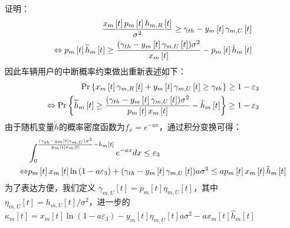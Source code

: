 证明：
\begin{align} \label{E4-15}
\frac{x_m\left[t\right]p_m\left[t\right]h_{m,R}\left[t\right]}{\sigma^2}\geq \gamma_{th}-y_m\left[t\right]\gamma_{m,U}\left[t\right] \\
\Leftrightarrow
p_m\left[t\right]{\widetilde{h}}_{m}\left[t\right]\geq \frac{{(\gamma_{th}-y_m\left[t\right]\gamma_{m,U}\left[t\right])\sigma^2}}{x_m\left[t\right]}
-p_m\left[t\right]{\hat{h}}_{m}\left[t\right]   \notag
\end{align}
因此车辆用户的中断概率约束做出重新表述如下：
\begin{align} \label{E4-16}
\Pr\left\{x_m\left[t\right]\gamma_{m,R}\left[t\right]+y_m\left[t\right]\gamma_{m,U}\left[t\right] \geq \gamma_{th}\right\}\geq1-\varepsilon_3    \\
\Leftrightarrow
\Pr\left\{{\widetilde{h}}_{m}\left[t\right]\geq \frac{{(\gamma_{th}-y_m\left[t\right]\gamma_{m,U}\left[t\right])\sigma^2}}{p_m\left[t\right]x_m\left[t\right]}
-{\hat{h}}_{m}\left[t\right]\right\}\geq1-\varepsilon_3                          \notag
\end{align}
由于随机变量$\widetilde{h}$的概率密度函数为$f_x={{e}^{-ax}}$，通过积分变换可得：
\begin{align} \label{E4-17}
&\int_{0}^{\frac{{(\gamma_{th}-y_m\left[t\right]\gamma_{m,U})\sigma^2}}{p_m\left[t\right]x_m\left[t\right]}
-{\hat{h}}_{m}\left[t\right]}{e^{-ax}dx}\le \varepsilon_3 \\
\Leftrightarrow
&p_m\left[t\right]x_m\left[t\right]\ln \left(1-a \varepsilon_3\right)+(\gamma_{th}-y_m\left[t\right]\gamma_{m,U}\left[t\right]) a \sigma^2
\leq a p_m\left[t\right]x_m\left[t\right]\hat{h}_{m}\left[t\right]   \notag
\end{align}
为了表达方便，我们定义
$\gamma_{m,U}\left[t\right]=p_m\left[t\right]\eta_{m,U}\left[t\right]$，其中$\eta_{m,U}\left[t\right]=h_{m,U}\left[t\right]/{\sigma^2}$，进一步的
${{\kappa }_{m}}\left[ t \right]={{x}_{m}}\left[ t \right]\ln \left( 1-a{{\varepsilon }_{3}} \right)-{{y}_{m}}\left[ t \right]{{\eta }_{m,U}}\left[ t \right]a{{\sigma }^{2}}-a{{x}_{m}}\left[ t \right]{{\hat{h}}_{m}}\left[ t \right]$


